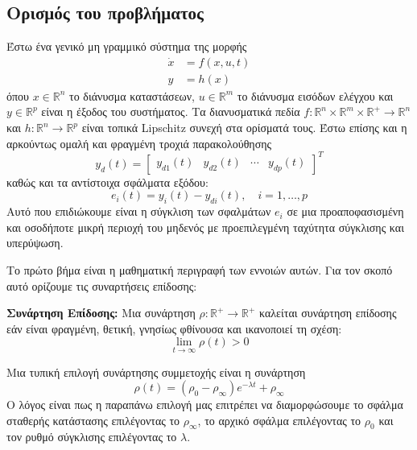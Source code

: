 \subsection{Ορισμός του προβλήματος}
Έστω ένα γενικό μη γραμμικό σύστημα της μορφής 
\begin{equation}
\begin{split}
\dot{x} &= f(x,u,t) \\
y &= h(x)
\end{split}
\label{eq:general_nonlinear_sys}
\end{equation}
όπου $x \in \mathbb{R}^n$ το διάνυσμα καταστάσεων, $ u\in \mathbb{R}^m$ το διάνυσμα εισόδων ελέγχου και $y \in \mathbb{R}^p$ είναι η έξοδος του συστήματος. Τα διανυσματικά πεδία $f: \mathbb{R}^n \times \mathbb{R}^m \times \mathbb{R}^+ \rightarrow \mathbb{R}^n$ και $h:\mathbb{R}^n \rightarrow \mathbb{R}^p$ είναι τοπικά Lipschitz συνεχή στα ορίσματά τους. Έστω επίσης και η αρκούντως ομαλή και φραγμένη τροχιά παρακολούθησης
\begin{equation*}
	y_d(t) = \begin{bmatrix}
		y_{d1}(t) & y_{d2}(t) & \cdots & y_{dp}(t)
	\end{bmatrix}^T
\end{equation*}
καθώς και τα αντίστοιχα σφάλματα εξόδου:
\begin{equation*}
	e_i(t) = y_i(t) - y_{di}(t), \quad i = 1,\dots ,p
\end{equation*}
Αυτό που επιδιώκουμε είναι η σύγκλιση των σφαλμάτων $e_i$ σε μια προαποφασισμένη και οσοδήποτε μικρή περιοχή του μηδενός με προεπιλεγμένη ταχύτητα σύγκλισης και υπερύψωση.

Το πρώτο βήμα είναι η μαθηματική περιγραφή των εννοιών αυτών. Για τον σκοπό αυτό ορίζουμε τις συναρτήσεις επίδοσης:

\textbf{Συνάρτηση Επίδοσης:} Μια συνάρτηση $\rho: \mathbb{R}^+ \rightarrow \mathbb{R}^+$ καλείται συνάρτηση επίδοσης εάν είναι φραγμένη, θετική, γνησίως φθίνουσα και ικανοποιεί τη σχέση:
\begin{equation*}
	\lim\limits_{t \rightarrow \infty} \rho(t) > 0
\end{equation*} 

Μια τυπική επιλογή συνάρτησης συμμετοχής είναι η συνάρτηση
\begin{equation}
	\rho(t) = ( \rho_0 - \rho_{\infty} ) e^{-\lambda t} + \rho_{\infty}
	\label{eq:exp_perf}
\end{equation}
Ο λόγος είναι πως η παραπάνω επιλογή μας επιτρέπει να διαμορφώσουμε το σφάλμα σταθερής κατάστασης επιλέγοντας το $\rho_{\infty}$, το αρχικό σφάλμα επιλέγοντας το $\rho_0$ και τον ρυθμό σύγκλισης επιλέγοντας το $\lambda$.

